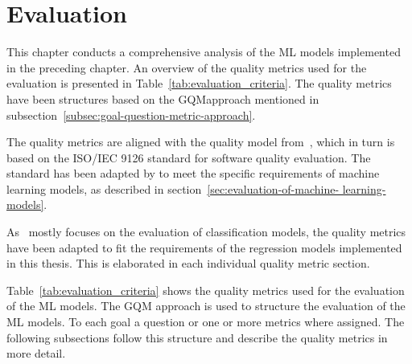 \chapter{Evaluation}\label{ch:evaluation}
This chapter conducts a comprehensive analysis of the \ac{ML} models implemented in
the preceding chapter.
An overview of the quality metrics used for the evaluation is presented in
Table~\ref{tab:evaluation_criteria}.
The quality metrics have been structures based on
the \ac{GQM}approach mentioned in subsection~\ref{subsec:goal-question-metric-approach}.

The quality metrics are aligned with the quality model
from~\cite{siebert2022construction}, which in turn is based on the ISO/IEC 9126 standard for
software quality evaluation.
The standard has been adapted by \cite{siebert2022construction} to meet the specific
requirements of machine learning models, as described in section~\ref{sec:evaluation-of-machine-
learning-models}.

As~\cite{siebert2022construction} mostly focuses on the evaluation of classification
models, the quality metrics have been adapted to fit the requirements of the regression
models implemented in this thesis.
This is elaborated in each individual quality metric section.

Table~\ref{tab:evaluation_criteria} shows the quality metrics used for the evaluation
of the \ac{ML} models.
The \ac{GQM} approach is used to structure the evaluation of the \ac{ML} models.
To each goal a question or one or more metrics where assigned.
The following subsections follow this structure and describe the quality metrics in more
detail.

